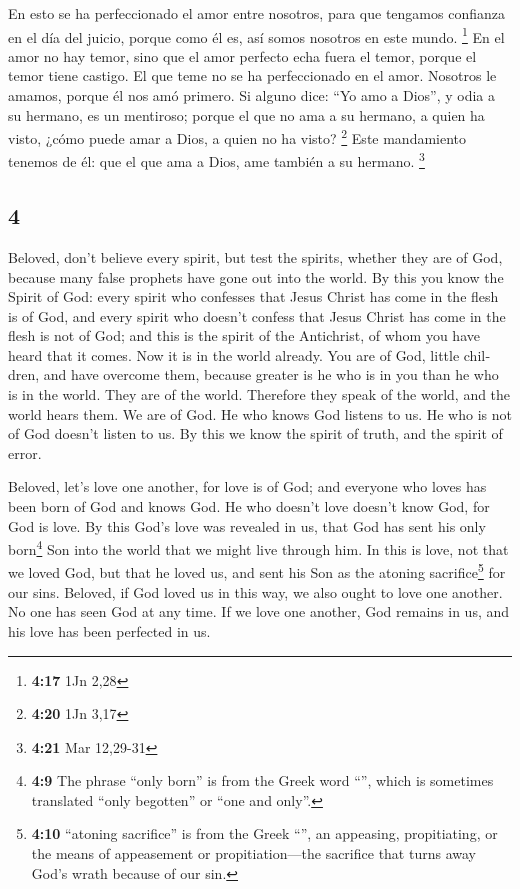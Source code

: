 \begin{paracol}{2}
 En esto se ha perfeccionado el amor entre nosotros, para
que tengamos confianza en el día del juicio, porque como él es, así
somos nosotros en este mundo. \footnote{\textbf{4:17} 1Jn 2,28}
 En el amor no hay temor, sino que el amor perfecto echa
fuera el temor, porque el temor tiene castigo. El que teme no se ha
perfeccionado en el amor.  Nosotros le amamos, porque él
nos amó primero.  Si alguno dice: ``Yo amo a Dios'', y
odia a su hermano, es un mentiroso; porque el que no ama a su hermano, a
quien ha visto, ¿cómo puede amar a Dios, a quien no ha visto?
\footnote{\textbf{4:20} 1Jn 3,17}  Este mandamiento
tenemos de él: que el que ama a Dios, ame también a su hermano.
\footnote{\textbf{4:21} Mar 12,29-31}

\switchcolumn
\begin{otherlanguage}{english}

\hypertarget{section-7}{%
\section{4}\label{section-7}}

 Beloved, don't believe every spirit, but test the
spirits, whether they are of God, because many false prophets have gone
out into the world.  By this you know the Spirit of God:
every spirit who confesses that Jesus Christ has come in the flesh is of
God,  and every spirit who doesn't confess that Jesus
Christ has come in the flesh is not of God; and this is the spirit of
the Antichrist, of whom you have heard that it comes. Now it is in the
world already.  You are of God, little children, and have
overcome them, because greater is he who is in you than he who is in the
world.  They are of the world. Therefore they speak of the
world, and the world hears them.  We are of God. He who
knows God listens to us. He who is not of God doesn't listen to us. By
this we know the spirit of truth, and the spirit of error.

 Beloved, let's love one another, for love is of God; and
everyone who loves has been born of God and knows God.  He
who doesn't love doesn't know God, for God is love.  By
this God's love was revealed in us, that God has sent his only
born\footnote{\textbf{4:9} The phrase ``only born'' is from the Greek
  word ``'', which is sometimes translated ``only
  begotten'' or ``one and only''.} Son into the world that we might live
through him.  In this is love, not that we loved God, but
that he loved us, and sent his Son as the atoning sacrifice\footnote{\textbf{4:10}
  ``atoning sacrifice'' is from the Greek ``'', an
  appeasing, propitiating, or the means of appeasement or
  propitiation---the sacrifice that turns away God's wrath because of
  our sin.} for our sins.  Beloved, if God loved us in
this way, we also ought to love one another.  No one has
seen God at any time. If we love one another, God remains in us, and his
love has been perfected in us.


\end{otherlanguage}
\end{paracol}
